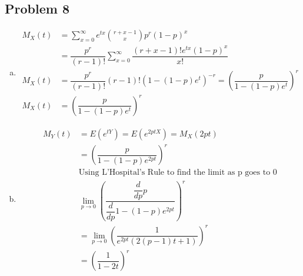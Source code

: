 \documentclass{article}
\begin{document}
\begin{flushleft}
\section*{Problem 8}
\begin{enumerate}[(a)]
\item
\begin{align*}
M_X(t)&=\sum_{x=0}^{\infty}e^{tx}{r+x-1 \choose x}p^r(1-p)^x\\
&=\dfrac{p^r}{(r-1)!}\sum_{x=0}^{\infty}\dfrac{(r+x-1)!e^{tx}(1-p)^x}{x!}\\
M_X(t)&=\dfrac{p^r}{(r-1)!}(r-1)!(1-(1-p)e^t)^{-r}=\left(\dfrac{p}{1-(1-p)e^t}\right)^{r}\\
M_X(t)&=\left(\dfrac{p}{1-(1-p)e^t}\right)^{r}
\end{align*}
\item
\begin{align*}
M_Y(t)&=E(e^{tY})=E(e^{2ptX})=M_X(2pt)\\
&=\left(\dfrac{p}{1-(1-p)e^{2pt}}\right) ^r\\
&\text{Using L'Hospital's Rule to find the limit as p goes to 0}\\
&\lim \limits_{p \to 0} \left(\dfrac{\dfrac{d}{dp}p}{\dfrac{d}{dp}1-(1-p)e^{2pt}}\right)^{r}\\
&=\lim \limits_{p \to 0} (\dfrac{1}{e^{2pt}(2(p-1)t+1)})^r\\
&=(\dfrac{1}{1-2t})^r
\end{align*}
\end{enumerate}

\end{flushleft}
\end{document}
